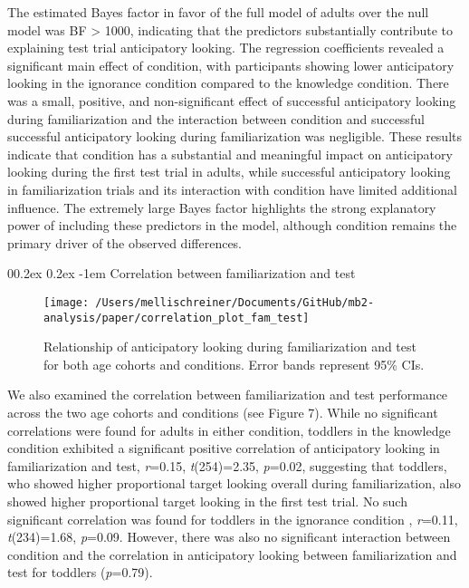 \documentclass[
  man,floatsintext]{apa6}
\makeatletter
\let\oldparagraph\paragraph
\renewcommand{\paragraph}{
    \@ifstar
      \xxxParagraphStar
      \xxxParagraphNoStar
  }
\newcommand{\xxxParagraphStar}[1]{\oldparagraph*{#1}\mbox{}}
\newcommand{\xxxParagraphNoStar}[1]{\oldparagraph{#1}\mbox{}}
\renewcommand{\paragraph}{\@startsection{paragraph}{4}{\parindent}%
  {0\baselineskip \@plus 0.2ex \@minus 0.2ex}%
  {-1em}%
  {\normalfont\normalsize\bfseries\itshape\typesectitle}}
\makeatother
\begin{document}
The estimated Bayes factor in favor of the full model of adults over the null model was BF \textgreater{} 1000, indicating that the predictors substantially contribute to explaining test trial anticipatory looking. The regression coefficients revealed a significant main effect of condition, with participants showing lower anticipatory looking in the ignorance condition compared to the knowledge condition. There was a small, positive, and non-significant effect of successful anticipatory looking during familiarization and the interaction between condition and successful successful anticipatory looking during familiarization was negligible. These results indicate that condition has a substantial and meaningful impact on anticipatory looking during the first test trial in adults, while successful anticipatory looking in familiarization trials and its interaction with condition have limited additional influence. The extremely large Bayes factor highlights the strong explanatory power of including these predictors in the model, although condition remains the primary driver of the observed differences.

\paragraph{Correlation between familiarization and test}\label{correlation-between-familiarization-and-test}

\begin{figure}

{\centering \texttt{[image: /Users/mellischreiner/Documents/GitHub/mb2-analysis/paper/correlation\_plot\_fam\_test]} 

}

\caption{Relationship of anticipatory looking during familiarization and test for both age cohorts and conditions. Error bands represent 95\% CIs.}\label{fig:fig7}
\end{figure}

We also examined the correlation between familiarization and test performance across the two age cohorts and conditions (see Figure 7). While no significant correlations were found for adults in either condition, toddlers in the knowledge condition exhibited a significant positive correlation of anticipatory looking in familiarization and test, \emph{r}=0.15, \emph{t}(254)=2.35, \emph{p}=0.02, suggesting that toddlers, who showed higher proportional target looking overall during familiarization, also showed higher proportional target looking in the first test trial. No such significant correlation was found for toddlers in the ignorance condition , \emph{r}=0.11, \emph{t}(234)=1.68, \emph{p}=0.09.
However, there was also no significant interaction between condition and the correlation in anticipatory looking between familiarization and test for toddlers (\emph{p}=0.79).
\end{document}
